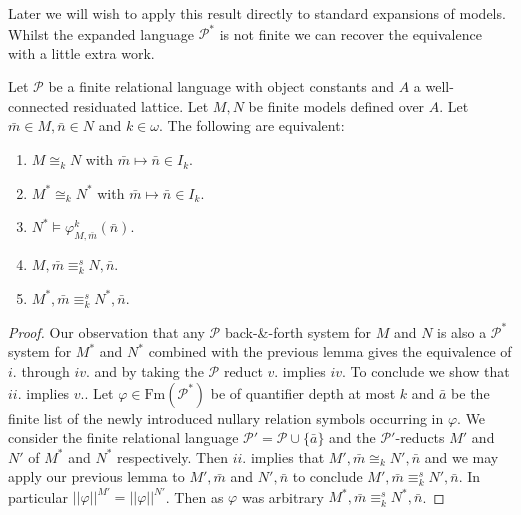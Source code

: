 \documentclass{lmcs} %
\newcommand{\?}{\ensuremath{\mkern0.4\thinmuskip}}
\let\isom=\cong%
\let\phi=\varphi
\newcommand{\CP}{\mathcal{P}}
\begin{document}
Later we will wish to apply this result directly to standard expansions of models. Whilst the expanded language $\CP^\ast$ is not finite we can recover the equivalence with a little extra work.

\begin{cor}\label{cor:standardEF}
    Let $\CP$ be a finite relational language with object constants and $A$ a well-connected residuated lattice. Let $M,N$ be finite models defined over $A$. Let $\bar{m}\in M,\bar{n}\in N$ and $k\in\omega$. The following are equivalent:\begin{enumerate}[label=\roman*.]
        \item $M\isom_k N$ with $\bar{m}\mapsto\bar{n}\in I_k$.
        \item $M^\ast\isom_k N^\ast$ with $\bar{m}\mapsto\bar{n}\in I_k$.
        \item $N^\ast\models\phi^k_{M,\bar{m}}(\bar{n})$.
        \item $M,\bar{m}\equiv^s_k N,\bar{n}$.
        \item $M^\ast,\bar{m}\equiv^s_k N^\ast,\bar{n}$. 
    \end{enumerate}    
\end{cor}
\begin{proof}
    Our observation that any $\CP$ back-\&-forth system for $M$ and $N$ is also a $\CP^\ast$ system for $M^\ast$ and $N^\ast$ combined with the previous lemma gives the equivalence of $i.$ through $iv.$ and by taking the $\CP$ reduct $v.$ implies $iv.$ To conclude we show that $ii.$ implies $v.$. Let $\phi\in \mathrm{Fm}(\CP^\ast)$ be of quantifier depth at most $k$ and $\bar{a}$ be the finite list of the newly introduced nullary relation symbols occurring in $\phi$. We consider the finite relational language $\CP'=\CP\cup\{\bar{a}\}$ and the $\CP'$-reducts $M'$ and $N'$ of $M^\ast$ and $N^\ast$ respectively. Then $ii.$ implies that $M',\bar{m}\isom_k N',\bar{n}$ and we may apply our previous lemma to $M',\bar{m}$ and $N',\bar{n}$ to conclude $M',\bar{m}\equiv^s_k N',\bar{n}$. In particular $||\phi||^{M'}=||\phi||^{N'}$. Then as $\phi$ was arbitrary $M^\ast,\bar{m}\equiv^s_k N^\ast,\bar{n}$.  
\end{proof}
\end{document}
